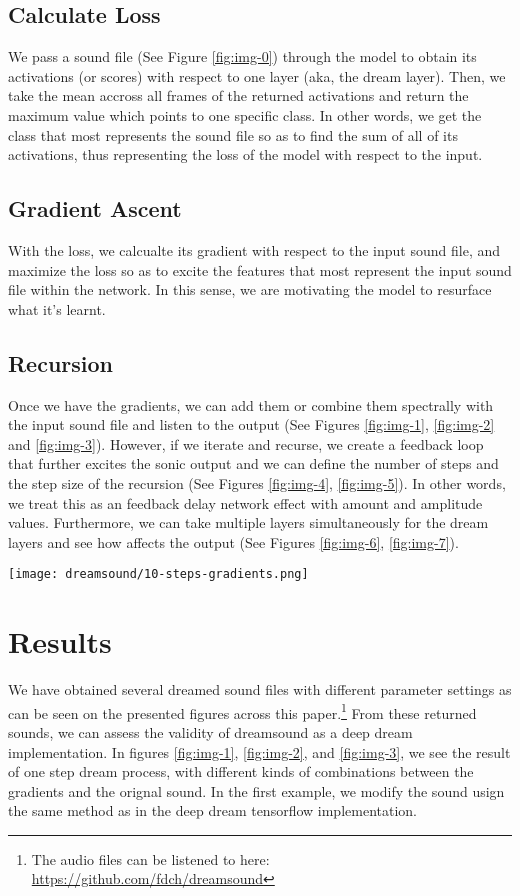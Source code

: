 \documentclass{nime-alternate}
\begin{document}
\subsection{Calculate Loss}
We pass a sound file (See Figure \ref{fig:img-0}) through the model to obtain its activations (or scores) with respect to one layer (aka, the dream layer). Then, we take the mean accross all frames of the returned activations and return the maximum value which points to one specific class. In other words, we get the class that most represents the sound file so as to find the sum of all of its activations, thus representing the loss of the model with respect to the input.



\subsection{Gradient Ascent}
With the loss, we calcualte its gradient with respect to the input sound file, and maximize the loss so as to excite the features that most represent the input sound file within the network. In this sense, we are motivating the model to resurface what it's learnt. 


\subsection{Recursion}
Once we have the gradients, we can add them or combine them spectrally with the input sound file and listen to the output (See Figures \ref{fig:img-1}, \ref{fig:img-2} and \ref{fig:img-3}). However, if we iterate and recurse, we create a feedback loop that further excites the sonic output and we can define the number of steps and the step size of the recursion (See Figures \ref{fig:img-4}, \ref{fig:img-5}). In other words, we treat this as an feedback delay network effect with amount and amplitude values. Furthermore, we can take multiple layers simultaneously for the dream layers and see how affects the output (See Figures \ref{fig:img-6}, \ref{fig:img-7}).

\begin{figure*}[htbp]
       \centering
              \texttt{[image: dreamsound/10-steps-gradients.png]}
       \caption{Recursively passing the gradients for 10 steps.}
       \label{fig:img-4}
\end{figure*}

\section{Results}
We have obtained several dreamed sound files with different parameter settings as can be seen on the presented figures across this paper.\footnote{The audio files can be listened to here: \url{https://github.com/fdch/dreamsound}} From these returned sounds, we can assess the validity of dreamsound as a deep dream implementation. In figures \ref{fig:img-1}, \ref{fig:img-2}, and \ref{fig:img-3}, we see the result of one step dream process, with different kinds of combinations between the gradients and the orignal sound. In the first example, we modify the sound usign the same method as in the deep dream tensorflow implementation. 
\end{document}
